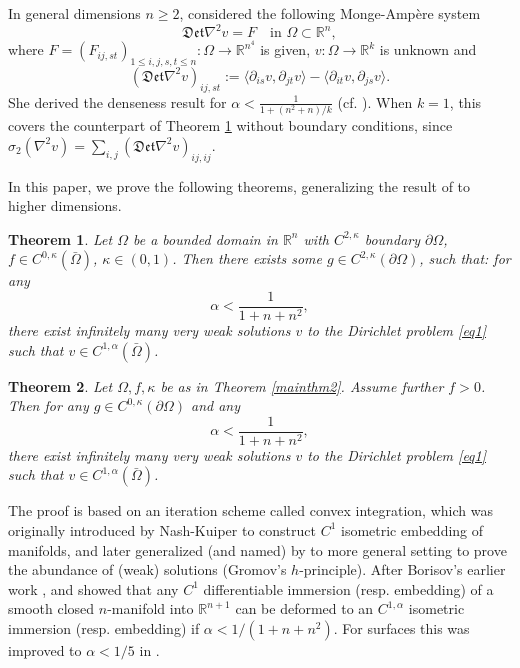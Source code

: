 \documentclass[reqno,12pt]{amsart}
\numberwithin{equation}{section}
\theoremstyle{plain}
\newtheorem{thm}{Theorem}[section]
\theoremstyle{definition}
\newcommand{\R}{\mathbb{R}}
\begin{document}
In general dimensions $n\ge 2$, \citet{lewicka22monge} considered the following Monge-Amp\`ere system
\begin{equation*}
\mathfrak{Det}\nabla^2 v=F\quad\text{in }\Omega\subset\R^n,
\end{equation*} 
where $F=(F_{ij,st})_{1\le i,j,s,t\le n}:\Omega\to\R^{n^4}$ is given, $v:\Omega\to\R^k$ is unknown and
\begin{equation*}
(\mathfrak{Det}\nabla^2 v)_{ij,st} :=\langle \partial_{is}v,\partial_{jt}v\rangle-\langle \partial_{it}v,\partial_{js}v\rangle.
\end{equation*}
She derived the denseness result for $\alpha<\frac{1}{1+(n^2+n)/k}$ (cf. \cite{lewicka23monge2d}). When $k=1$, this covers the counterpart of Theorem \ref{mainthm2} without boundary conditions, since $\sigma_2(\nabla^2 v)=\sum_{i,j}(\mathfrak{Det}\nabla^2v)_{ij,ij}$.
  
In this paper, we prove the following theorems, generalizing the result of \citet{cao23dirichlet} to higher dimensions.
\begin{thm}\label{mainthm2}
    Let $\Omega$ be a bounded domain in $\R^n$ with $C^{2,\kappa}$ boundary $\partial\Omega$, $f\in C^{0,\kappa}(\bar\Omega)$, $\kappa\in (0,1)$. Then there exists some $ g\in C^{2,\kappa}(\partial\Omega)$, such that: for any
    \begin{equation*}
    \alpha < \frac{1}{1+n+n^2},
\end{equation*}
there exist infinitely many very weak solutions $v$ to the Dirichlet problem \eqref{eq1} such that $v\in C^{1,\alpha}(\bar\Omega)$.
\end{thm}
\begin{thm}\label{mainthm}
     Let $\Omega,f,\kappa$ be as in Theorem \eqref{mainthm2}. Assume further $f>0$. Then for any $ g\in C^{0,\kappa}(\partial\Omega)$ and any
    \begin{equation*}
    \alpha < \frac{1}{1+n+n^2},
\end{equation*}
there exist infinitely many very weak solutions $v$ to the Dirichlet problem \eqref{eq1} such that $v\in C^{1,\alpha}(\bar\Omega)$.
\end{thm}


The proof is based on an iteration scheme called convex integration, which was originally introduced by Nash-Kuiper \cite{nash, kuiper} to construct $C^1$ isometric embedding of manifolds, and later generalized (and named) by \citet{gromov74convex, gromov86partial} to more general setting to prove the abundance of (weak) solutions (Gromov's $h$-principle). After Borisov's earlier work \cite{borisov1965isometric,borisov2004irregular}, \citet*{conti12hprinciple,conti12errata} and \citet{cao22global} showed that any $C^1$ differentiable immersion (resp. embedding) of a smooth closed $n$-manifold into $\R^{n+1}$ can be deformed to an $C^{1,\alpha}$ isometric immersion (resp. embedding) if $\alpha<1/(1+n+n^2)$. For surfaces this was improved to $\alpha<1/5$ in \cite{delellis18nash,cao22global}.
\end{document}
